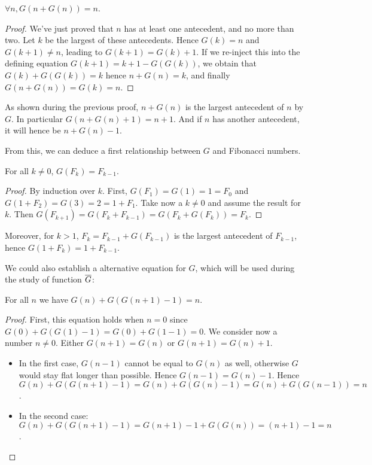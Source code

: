 \documentclass[a4paper,11pt]{article}
\begin{document}
\begin{theorem}\label{Gonto}
$\forall n, G(n+G(n))=n$.
\end{theorem}
\begin{proof}
We've just proved that $n$ has at least one antecedent, and
no more than two. Let $k$ be the largest of these antecedents.
Hence $G(k)=n$ and $G(k+1)\neq n$, leading to $G(k+1)=G(k)+1$.
If we re-inject this into the defining equation $G(k+1) = k+1 -
G(G(k))$, we obtain that $G(k)+G(G(k))=k$ hence $n+G(n)=k$,
and finally $G(n+G(n))=G(k)=n$.
\end{proof}

As shown during the previous proof, $n+G(n)$ is the largest antecedent
of $n$ by $G$. In particular $G(n+G(n)+1)=n+1$. And if $n$ has another
antecedent, it will hence be $n+G(n)-1$.

From this, we can deduce a first relationship between $G$ and
Fibonacci numbers.
\begin{theorem}\label{Gfib} For all $k\neq0$, $G(F_k)=F_{k-1}$.
\end{theorem}
\begin{proof}By induction over $k$. First, $G(F_1)=G(1)=1=F_0$
and $G(1+F_2)=G(3)=2=1+F_1$. Take now a $k\neq 0$ and assume the
result for $k$. Then $G(F_{k+1})=G(F_k+F_{k-1})=G(F_k+G(F_k))=F_k$.
\end{proof}

Moreover, for $k>1$, $F_k = F_{k-1}+G(F_{k-1})$ is the largest antecedent of
$F_{k-1}$, hence $G(1+F_k)=1+F_{k-1}$.

We could also establish a alternative equation for $G$, which will be
used during the study of function $\overline{G}$:

\begin{theorem}\label{Galt} For all $n$ we have $G(n) + G(G(n+1)-1) = n$.
\end{theorem}
\begin{proof}
First, this equation holds when $n=0$ since
$G(0)+G(G(1)-1) = G(0) + G(1-1) = 0$.
We consider now a number $n\neq 0$. Either $G(n+1)=G(n)$ or $G(n+1)=G(n)+1$.
\begin{itemize}
\item In the first case, $G(n-1)$ cannot be equal to $G(n)$ as well,
otherwise $G$ would stay flat longer than possible. Hence $G(n-1)=G(n)-1$.
Hence $G(n)+G(G(n+1)-1) = G(n) + G(G(n)-1) = G(n)+G(G(n-1)) = n$.
\item In the second case:
$G(n) + G(G(n+1)-1) = G(n+1)-1 + G(G(n)) = (n+1)-1 = n$.
\end{itemize}
\end{proof}
\end{document}
